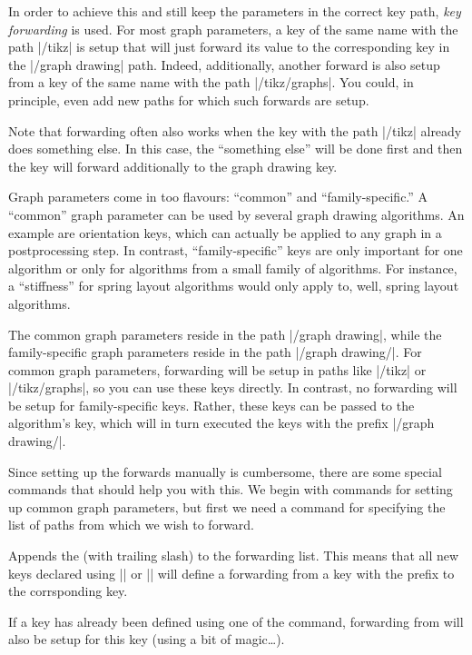 In order to achieve this and still keep the parameters in the correct
key path, \emph{key forwarding} is used. For most graph parameters, a
key of the same name with the path |/tikz| is setup that will just
forward its value to the corresponding key in the |/graph drawing|
path. Indeed, additionally, another forward is also setup from a key
of the same name with the path |/tikz/graphs|. You could, in
principle, even add new paths for which such forwards are setup.

Note that forwarding often also works when the key with the path
|/tikz| already does something else. In this case, the ``something
else'' will be done first and then the key will forward additionally
to the graph drawing key.

Graph parameters come in too flavours: ``common'' and
``family-specific.'' A ``common'' graph parameter can be used by
several graph drawing algorithms. An example are orientation keys,
which can actually be applied to any graph in a postprocessing
step. In contrast, ``family-specific'' keys are only important for
one algorithm or only for algorithms from a small family of
algorithms. For instance, a ``stiffness'' for spring layout algorithms 
would only apply to, well, spring layout algorithms.

The common graph parameters reside in the path |/graph drawing|,
while the family-specific graph parameters reside in the path
|/graph drawing/|. For common graph parameters,
forwarding will be setup in paths like |/tikz| or |/tikz/graphs|, so
you can use these keys directly. In contrast, no forwarding will be
setup for family-specific keys. Rather, these keys can be passed to the
algorithm's key, which will in turn executed the keys with the
prefix |/graph drawing/|.

Since setting up the forwards manually is cumbersome, there are some
special commands that should help you with this. We begin with
commands for setting up common graph parameters, but first we need a
command for specifying the list of paths from which we wish to
forward.

\begin{command}{\pgfgdappendtoforwardinglist{}}
  Appends the  (with trailing slash) to the forwarding
  list. This means that all new keys declared using
  |\pgfgddeclareforwardedkeys| or |\pgfgddeclarealgorithmkey| will
  define a forwarding from a key with the prefix  to the
  corrsponding key. 

  If a key has already been defined using one of the command,
  forwarding from  will also 
  be setup for this key (using a bit of magic\ldots).  
\end{command}


